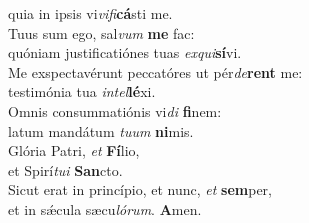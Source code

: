 \oddverse quia in ipsis vi\textit{vi}\textit{fi}\textbf{cá}sti me.\\
\evenverse Tuus sum ego, sal\textit{vum} \textbf{me} fac:~\*\\
\evenverse quóniam justificatiónes tuas \textit{ex}\textit{qui}\textbf{sí}vi.\\
\oddverse Me exspectavérunt peccatóres ut pér\textit{de}\textbf{rent} me:~\*\\
\oddverse testimónia tua \textit{in}\textit{tel}\textbf{lé}xi.\\
\evenverse Omnis consummatiónis vi\textit{di} \textbf{fi}nem:~\*\\
\evenverse latum mandátum \textit{tu}\textit{um} \textbf{ni}mis.\\
\oddverse Glória Patri, \textit{et} \textbf{Fí}lio,~\*\\
\oddverse et Spirí\textit{tu}\textit{i} \textbf{San}cto.\\
\evenverse Sicut erat in princípio, et nunc, \textit{et} \textbf{sem}per,~\*\\
\evenverse et in sǽcula sæcu\textit{ló}\textit{rum}. \textbf{A}men.\\
